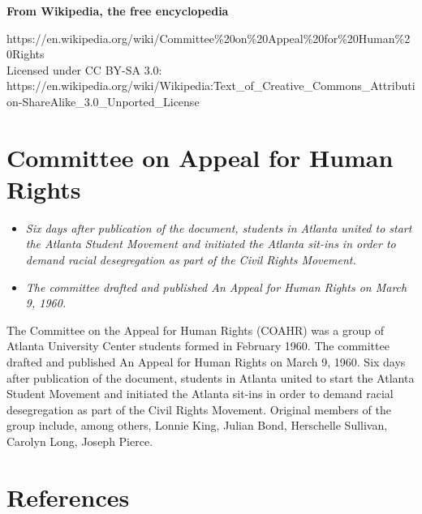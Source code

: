 \textbf{From Wikipedia, the free encyclopedia}

https://en.wikipedia.org/wiki/Committee\%20on\%20Appeal\%20for\%20Human\%20Rights\\
Licensed under CC BY-SA 3.0:\\
https://en.wikipedia.org/wiki/Wikipedia:Text\_of\_Creative\_Commons\_Attribution-ShareAlike\_3.0\_Unported\_License

\section{Committee on Appeal for Human
Rights}\label{committee-on-appeal-for-human-rights}

\begin{itemize}
\item
  \emph{Six days after publication of the document, students in Atlanta
  united to start the Atlanta Student Movement and initiated the Atlanta
  sit-ins in order to demand racial desegregation as part of the Civil
  Rights Movement.}
\item
  \emph{The committee drafted and published An Appeal for Human Rights
  on March 9, 1960.}
\end{itemize}

The Committee on the Appeal for Human Rights (COAHR) was a group of
Atlanta University Center students formed in February 1960. The
committee drafted and published An Appeal for Human Rights on March 9,
1960. Six days after publication of the document, students in Atlanta
united to start the Atlanta Student Movement and initiated the Atlanta
sit-ins in order to demand racial desegregation as part of the Civil
Rights Movement. Original members of the group include, among others,
Lonnie King, Julian Bond, Herschelle Sullivan, Carolyn Long, Joseph
Pierce.

\section{References}\label{references}
